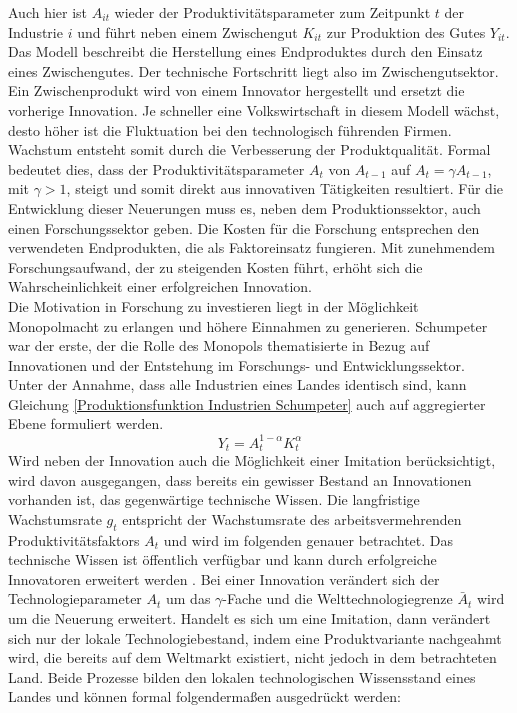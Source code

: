 Auch hier ist $A_{it}$ wieder der Produktivitätsparameter zum Zeitpunkt $t$ der Industrie $i$ und führt neben einem Zwischengut $K_{it}$ zur Produktion des Gutes $Y_{it}$. Das Modell beschreibt die Herstellung eines Endproduktes durch den Einsatz eines Zwischengutes. Der technische Fortschritt liegt also im Zwischengutsektor.  Ein Zwischenprodukt wird von einem Innovator hergestellt und ersetzt die vorherige Innovation. Je schneller eine Volkswirtschaft in diesem Modell wächst, desto höher ist die Fluktuation bei den technologisch führenden Firmen. \\ Wachstum entsteht somit durch die Verbesserung der Produktqualität. Formal bedeutet dies, dass der Produktivitätsparameter $A_t$ von $A_{t-1}$ auf $A_t=\gamma A_{t-1}$, mit $\gamma>1$, steigt und somit direkt aus innovativen Tätigkeiten resultiert. Für die Entwicklung dieser Neuerungen muss es, neben dem Produktionssektor, auch einen Forschungssektor geben. Die Kosten für die Forschung entsprechen den verwendeten Endprodukten, die als  Faktoreinsatz fungieren. Mit zunehmendem Forschungsaufwand, der zu steigenden Kosten führt, erhöht sich die Wahrscheinlichkeit einer erfolgreichen Innovation. \\
%
Die Motivation in Forschung zu investieren liegt in der Möglichkeit Monopolmacht zu erlangen und höhere Einnahmen zu generieren. Schumpeter war der erste, der die Rolle des Monopols thematisierte in Bezug auf Innovationen und der Entstehung im Forschungs- und Entwicklungssektor. \\ Unter der Annahme, dass alle Industrien eines Landes identisch sind, kann Gleichung \eqref{Produktionsfunktion Industrien Schumpeter} auch auf aggregierter Ebene formuliert werden.
%
	\begin{equation}
		Y_t=A_t^{1-\alpha}K_t^\alpha
	\end{equation}
%
Wird neben der Innovation auch die Möglichkeit einer Imitation berücksichtigt, wird davon ausgegangen, dass bereits ein gewisser Bestand an Innovationen vorhanden ist, das gegenwärtige technische Wissen. Die langfristige Wachstumsrate $g_t$ entspricht der Wachstumsrate des arbeitsvermehrenden Produktivitätsfaktors $A_t$ und wird im folgenden genauer betrachtet. Das technische Wissen ist öffentlich verfügbar und kann durch erfolgreiche Innovatoren erweitert werden \cite{Aghion.1992,Aghion.1998}.  Bei einer Innovation verändert sich der Technologieparameter $A_t$ um das $\gamma$-Fache und die Welttechnologiegrenze $\bar{A}_t$ wird um die Neuerung erweitert. Handelt es sich um eine Imitation, dann verändert sich nur der lokale Technologiebestand, indem eine Produktvariante nachgeahmt wird, die bereits auf dem Weltmarkt existiert, nicht jedoch in dem betrachteten Land. Beide Prozesse bilden den lokalen technologischen Wissensstand eines Landes und können formal folgendermaßen ausgedrückt werden: 
